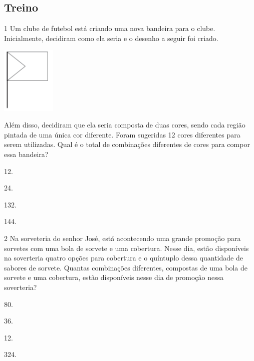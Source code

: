 \begin{mdframed}[linewidth=2pt,linecolor=salmao,roundcorner=2pt]
\begin{escolha}
{\begin{escolha}
\begin{mdframed}[linewidth=2pt,linecolor=salmao,roundcorner=2pt]
\vspace{2cm}
\end{mdframed}

\subsection{Treino}

\num{1} Um clube de futebol está criando uma nova bandeira para o clube.
Inicialmente, decidiram como ela seria e o desenho a seguir foi criado.

\includegraphics[width=1.02511in,height=1.26282in]{media/image140.png}

Além disso, decidiram que ela seria composta de duas cores, sendo cada
região pintada de uma única cor diferente. Foram sugeridas 12 cores
diferentes para serem utilizadas. Qual é o total de combinações
diferentes de cores para compor essa bandeira?

\begin{escolha}
\item
  12.
\item
  24.
\item
  132.
\item
  144.
\end{escolha}

\num{2} Na sorveteria do senhor José, está acontecendo uma grande promoção para
sorvetes com uma bola de sorvete e uma cobertura. Nesse dia, estão
disponíveis na soverteria quatro opções para cobertura e o quíntuplo dessa
quantidade de sabores de sorvete. Quantas combinações diferentes, compostas de uma bola de
sorvete e uma cobertura, estão disponíveis nesse dia de promoção nessa
soverteria?

\begin{escolha}
\item
  80.
\item
  36.
\item
  12.
\item
  324.
\end{escolha}


\end{escolha}}
\end{escolha}
\end{mdframed}
